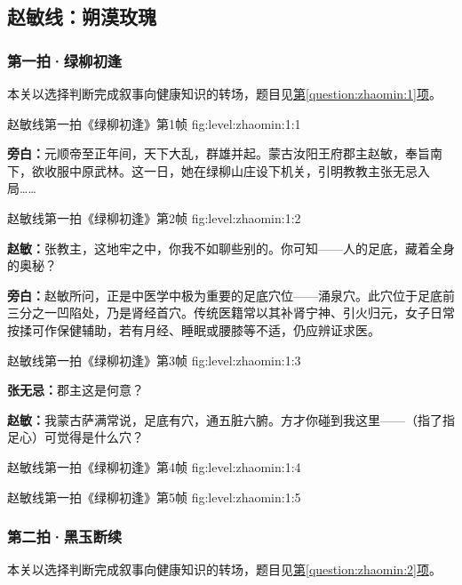 
\clearpage
\subsection{赵敏线：朔漠玫瑰}

\subsubsection{第一拍·绿柳初逢}\label{plot:zhaomin:1}
本关以选择判断完成叙事向健康知识的转场，题目见\hyperref[question:zhaomin:1]{第\ref*{question:zhaomin:1}项}。

  {赵敏线第一拍《绿柳初逢》第1帧}
  {fig:level:zhaomin:1:1}
  {\scriptsize}
  {\textbf{旁白：}元顺帝至正年间，天下大乱，群雄并起。蒙古汝阳王府郡主赵敏，奉旨南下，欲收服中原武林。这一日，她在绿柳山庄设下机关，引明教教主张无忌入局……\par}

  {赵敏线第一拍《绿柳初逢》第2帧}
  {fig:level:zhaomin:1:2}
  {\scriptsize}
  {\textbf{赵敏：}张教主，这地牢之中，你我不如聊些别的。你可知——人的足底，藏着全身的奥秘？\par
\textbf{旁白：}赵敏所问，正是中医学中极为重要的足底穴位——涌泉穴。此穴位于足底前三分之一凹陷处，乃是肾经首穴。传统医籍常以其补肾宁神、引火归元，女子日常按揉可作保健辅助，若有月经、睡眠或腰膝等不适，仍应辨证求医。\par}

  {赵敏线第一拍《绿柳初逢》第3帧}
  {fig:level:zhaomin:1:3}
  {\scriptsize}
  {\textbf{张无忌：}郡主这是何意？\par
\textbf{赵敏：}我蒙古萨满常说，足底有穴，通五脏六腑。方才你碰到我这里——（指了指足心）可觉得是什么穴？\par}

\clearpage

  {赵敏线第一拍《绿柳初逢》第4帧}
  {fig:level:zhaomin:1:4}
  {\scriptsize}
  {\mbox{}}

  {赵敏线第一拍《绿柳初逢》第5帧}
  {fig:level:zhaomin:1:5}
  {\scriptsize}
  {\mbox{}}

\subsubsection{第二拍·黑玉断续}\label{plot:zhaomin:2}
本关以选择判断完成叙事向健康知识的转场，题目见\hyperref[question:zhaomin:2]{第\ref*{question:zhaomin:2}项}。

